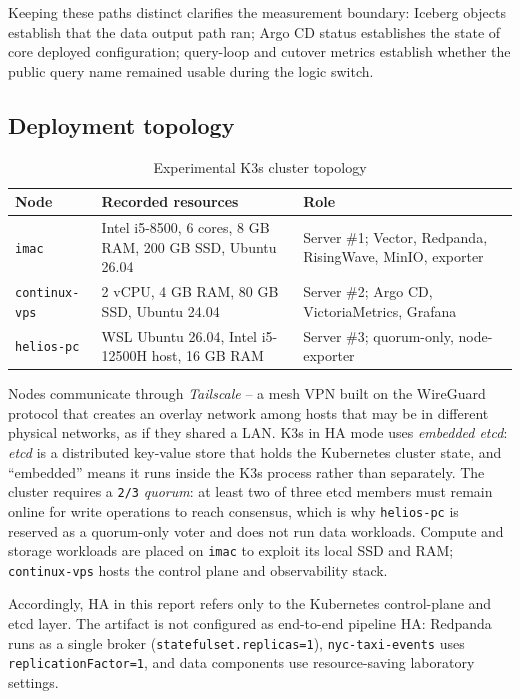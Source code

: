 Keeping these paths distinct clarifies the measurement boundary: Iceberg objects establish that the data output path ran; Argo CD status establishes the state of core deployed configuration; query-loop and cutover metrics establish whether the public query name remained usable during the logic switch.

\subsection{Deployment topology}
\begin{table}[t!]
\centering
\caption{Experimental K3s cluster topology}
\label{tab:topology-en}
\begin{tabularx}{\textwidth}{@{}p{}p{}Y@{}}
\toprule
\textbf{Node} & \textbf{Recorded resources} & \textbf{Role}\\
\midrule
\texttt{imac} & Intel i5-8500, 6 cores, 8 GB RAM, 200 GB SSD, Ubuntu 26.04 & Server \#1; Vector, Redpanda, RisingWave, MinIO, exporter\\
\texttt{continux-vps} & 2 vCPU, 4 GB RAM, 80 GB SSD, Ubuntu 24.04 & Server \#2; Argo CD, VictoriaMetrics, Grafana\\
\texttt{helios-pc} & WSL Ubuntu 26.04, Intel i5-12500H host, 16 GB RAM & Server \#3; quorum-only, node-exporter\\
\bottomrule
\end{tabularx}
\end{table}

Nodes communicate through \emph{Tailscale} -- a mesh VPN built on the WireGuard protocol that creates an overlay network among hosts that may be in different physical networks, as if they shared a LAN. K3s in HA mode uses \emph{embedded etcd}: \emph{etcd} is a distributed key-value store that holds the Kubernetes cluster state, and ``embedded'' means it runs inside the K3s process rather than separately. The cluster requires a \texttt{2/3} \emph{quorum}: at least two of three etcd members must remain online for write operations to reach consensus, which is why \texttt{helios-pc} is reserved as a quorum-only voter and does not run data workloads. Compute and storage workloads are placed on \texttt{imac} to exploit its local SSD and RAM; \texttt{continux-vps} hosts the control plane and observability stack.

Accordingly, HA in this report refers only to the Kubernetes control-plane and etcd layer. The artifact is not configured as end-to-end pipeline HA: Redpanda runs as a single broker (\texttt{statefulset.replicas=1}), \texttt{nyc-taxi-events} uses \texttt{replicationFactor=1}, and data components use resource-saving laboratory settings.

